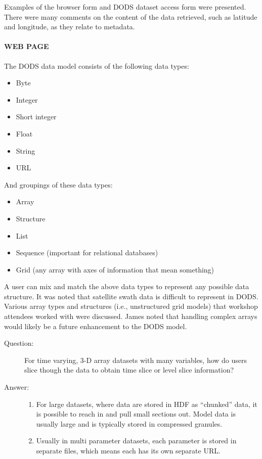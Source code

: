 Examples of the browser form and DODS dataset access form were
presented.  There were many comments on the content of the data
retrieved, such as latitude and longitude, as they relate to metadata.

\paragraph{WEB PAGE}  The DODS data model consists of the following data types:
\begin{itemize}
\item Byte
\item Integer
\item Short integer
\item Float
\item String
\item URL
\end{itemize}

And groupings of these data types:
\begin{itemize}
\item Array
\item Structure
\item List
\item Sequence (important for relational databases)
\item Grid (any array with axes of information that mean something)
\end{itemize}

A user can mix and match the above data types to represent any
possible data structure.  It was noted that satellite swath data is
difficult to represent in DODS.  Various array types and structures
(i.e., unstructured grid models) that workshop attendees worked with
were discussed.  James noted that handling complex arrays would likely
be a future enhancement to the DODS model.

\begin{description}
\item[Question:] For time varying, 3-D array datasets with many
  variables, how do users slice though the data to obtain time slice
  or level slice information?
\item[Answer:]  
\begin{enumerate}
\item For large datasets, where data are stored in HDF as ``chunked''
  data, it is possible to reach in and pull small sections out.  Model
  data is usually large and is typically stored in compressed
  granules.
\item Usually in multi parameter datasets, each parameter is stored in
  separate files, which means each has its own separate URL.
\end{enumerate}
\end{description}

